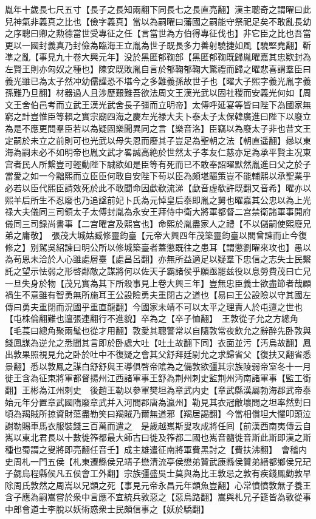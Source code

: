 胤年十歲長七尺五寸【長子之長知兩翻下同長七之長直亮翻】漢主聰奇之謂曜曰此兒神氣非義真之比也【儉字義真】當以為嗣曜曰藩國之嗣能守祭祀足矣不敢亂長幼之序聰曰卿之勲德當世受專征之任【言當世為方伯得專征伐也】非它臣之比也吾當更以一國封義真乃封儉為臨海王立胤為世子既長多力善射驍捷如風【驍堅堯翻】靳凖之亂【事見九十卷大興元年】没於黑匿郁鞠部【黑匿郁鞠既歸胤曜嘉其忠欵封為左賢王則亦匈奴之種也】陳安既敗胤自言於郁鞠郁鞠大驚禮而歸之曜悲喜謂羣臣曰義光雖已為太子然冲幼儒謹恐不堪今之多難義孫故世子也【曜大子熙字義光胤字義孫難乃旦翻】材器過人且涉歷艱難吾欲法周文王漢光武以固社稷而安義光何如【周文王舍伯邑考而立武王漢光武舍長子彊而立明帝】太傅呼延宴等皆曰陛下為國家無窮之計豈惟臣等賴之實宗廟四海之慶左光禄大夫卜泰太子太保韓廣進曰陛下以廢立為是不應更問羣臣若以為疑固樂聞異同之言【樂音洛】臣竊以為廢太子非也昔文王定嗣於未立之前則可也光武以母失恩而廢其子豈足為聖朝之法【朝直遥翻】曏以東海為嗣未必不如明帝也胤文武才畧誠高絶於世然太子孝友仁慈亦足為承平賢主况東宫者民人所繫豈可輕動陛下誠欲如是臣等有死而已不敢奉詔曜默然胤進曰父之於子當愛之如一今黜熙而立臣臣何敢自安陛下苟以臣為頗堪驅策豈不能輔熙以承聖業乎必若以臣代熙臣請效死於此不敢聞命因歔欷流涕【歔音虚欷許既翻又音希】曜亦以熙羊后所生不忍廢也乃追諡前妃卜氏為元悼皇后泰即胤之舅也曜嘉其公忠以為上光禄大夫儀同三司領太子太傅封胤為永安王拜侍中衛大將軍都督二宫禁衛諸軍事開府儀同三司録尚書事【二宫曜宫及熙宫也】命熙於胤盡家人之禮【不以儲嗣使熙廢兄弟之庸敬】　張茂大城姑臧修靈鈞臺【元帝大興四年茂築靈鈞臺以閻曾諫而止今復修之】别駕吳紹諫曰明公所以修城築臺者蓋懲既往之患耳【謂懲劉曜來攻也】愚以為苟恩未洽於人心雖處層臺【處昌呂翻】亦無所益適足以疑羣下忠信之志失士民繫託之望示怯弱之形啓鄰敵之謀將何以佐天子霸諸侯乎願亟罷兹役以息勞費茂曰亡兄一旦失身於物【茂兄實為其下所殺事見上卷大興三年】豈無忠臣義士欲盡節者哉顧禍生不意雖有智勇無所施耳王公設險勇夫重閉古之道也【易曰王公設險以守其國左傳曰勇夫重閉而況國乎重直龍翻】今國家未靖不可以太平之理責人於屯邅之世也【屯株倫翻難也邅張連翻行不進貌】卒為之【卒子恤翻】　王敦從子允之方總角【毛萇曰總角聚兩髦也從才用翻】敦愛其聰警常以自隨敦常夜飲允之辭醉先卧敦與錢鳳謀為逆允之悉聞其言即於卧處大吐【吐土故翻下同】衣面並污【汚烏故翻】鳳出敦果照視見允之卧於吐中不復疑之會其父舒拜廷尉允之求歸省父【復扶又翻省悉景翻】悉以敦鳳之謀白舒舒與王導俱啓帝隂為之備敦欲彊其宗族陵弱帝室冬十一月徙王含為征東將軍都督揚州江西諸軍事王舒為荆州刺史監荆州沔南諸軍事【監工銜翻】王彬為江州刺史　後趙王勒以參軍樊坦為章武内史【章武縣漢屬勃海郡武帝泰始元年分置章武國隋廢章武并入河間郡唐為瀛州】勒見其衣冠敝壞問之坦率然對曰頃為羯賊所掠資財蕩盡勒笑曰羯賊乃爾無道邪【羯居謁翻】今當相償坦大懼叩頭泣謝勒賜車馬衣服裝錢三百萬而遣之　是歲越嶲斯叟攻成將任囘【前漢西南夷傳云自嶲以東北君長以十數徙筰都最大師古曰徙及筰都二國也嶲音髓徙音斯此斯即漢之斯種也蜀謂之叟將即亮翻任音壬】成主雄遣征南將軍費黑討之【費扶沸翻】　會稽内史周札一門五侯【札東遷縣侯兄靖子懋清流亭侯懋弟贊武康縣侯贊弟縉都鄉侯兄玘子勰烏程縣侯凡五侯會工外翻】宗族彊盛吳士莫與為比王敦忌之敦有疾錢鳳勸敦早除周氏敦然之周嵩以兄顗之死【事見元帝永昌元年顗魚豈翻】心常憤憤敦無子養王含子應為嗣嵩嘗於衆中言應不宜統兵敦惡之【惡烏路翻】嵩與札兄子筵皆為敦從事中郎會道士李脫以妖術惑衆士民頗信事之【妖於驕翻】

